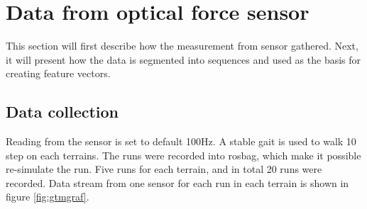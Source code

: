 \documentclass[USenglish]{ifimaster}  %
\begin{document}
	\section{Data from optical force sensor}
	This section will first describe how the measurement from sensor gathered. Next, it will present how the data is segmented into sequences and used as the basis for creating feature vectors.
	
	\subsection{Data collection}
	Reading from the sensor is set to default 100Hz. A stable gait is used to walk 10 step on each terrains. The runs were recorded into rosbag, which make it possible re-simulate the run. Five runs for each terrain, and in total 20 runs were recorded. Data stream from one sensor for each run in each terrain is shown in figure \ref{fig:gtmgraf}.
	
\end{document}
